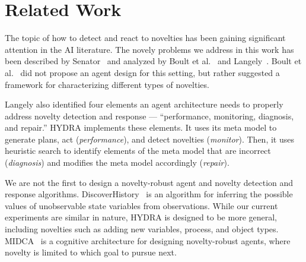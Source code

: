 \documentclass[sigconf]{aamas}
\begin{document}





\section{Related Work}

The topic of how to detect and react to novelties has been gaining significant attention in the AI literature. 
The novely problems we address in this work has been described by Senator~\cite{senator2019sailon} 
and analyzed by Boult et al.~\cite{boult2021towards}
and Langely~\cite{langley2020open}. 
Boult et al.~\cite{boult2021towards,langley2020open} did not propose an agent design for this setting, but rather suggested a framework for characterizing different types of novelties. 


Langely also identified four elements an agent architecture needs to properly address novelty detection and response --- ``performance, monitoring, diagnosis, and repair.'' 
HYDRA implements these elements. 
It uses its meta model to generate plans, act (\emph{performance}), and detect novelties (\emph{monitor}). 
Then, it uses heuristic search to identify elements of the meta model that are incorrect (\emph{diagnosis}) and modifies the meta model accordingly (\emph{repair}). 



We are not the first to design a novelty-robust agent and novelty detection and response algorithms. DiscoverHistory~\cite{molineaux2012discoverhistory} is an algorithm for inferring the possible values of unobservable state variables from observations. While our current experiments are similar in nature, HYDRA is designed to be more general, including novelties such as adding new variables, process, and object types. MIDCA~\cite{paisner2014goal} is a cognitive architecture for designing novelty-robust agents, where novelty is limited to which goal to pursue next. 

\end{document}
